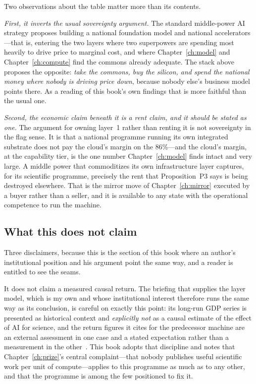 Two observations about the table matter more than its contents.

\emph{First, it inverts the usual sovereignty argument.} The standard middle-power AI strategy proposes building a national foundation model and national accelerators---that is, entering the two layers where two superpowers are spending most heavily to drive price to marginal cost, and where Chapter~\ref{ch:model} and Chapter~\ref{ch:compute} find the commons already adequate. The stack above proposes the opposite: \emph{take the commons, buy the silicon, and spend the national money where nobody is driving price down}, because nobody else's business model points there. As a reading of this book's own findings that is more faithful than the usual one.

\emph{Second, the economic claim beneath it is a rent claim, and it should be stated as one.} The argument for owning layer~1 rather than renting it is not sovereignty in the flag sense. It is that a national programme running its own integrated substrate does not pay the cloud's margin on the 86\%---and the cloud's margin, at the capability tier, is the one number Chapter~\ref{ch:model} finds intact and very large. A middle power that commoditizes its own infrastructure layer captures, for its scientific programme, precisely the rent that Proposition~P3 says is being destroyed elsewhere. That is the mirror move of Chapter~\ref{ch:mirror} executed by a buyer rather than a seller, and it is available to any state with the operational competence to run the machine.

\subsection{What this does not claim}

Three disclaimers, because this is the section of this book where an author's institutional position and his argument point the same way, and a reader is entitled to see the seams.

It does not claim a measured causal return. The briefing that supplies the layer model, which is my own and whose institutional interest therefore runs the same way as its conclusion, is careful on exactly this point: its long-run GDP series is presented as historical context and \emph{explicitly not} as a causal estimate of the effect of AI for science, and the return figures it cites for the predecessor machine are an external assessment in one case and a stated expectation rather than a measurement in the other~\cite{ai4si-stack}. This book adopts that discipline and notes that Chapter~\ref{ch:prize}'s central complaint---that nobody publishes useful scientific work per unit of compute---applies to this programme as much as to any other, and that the programme is among the few positioned to fix it.

